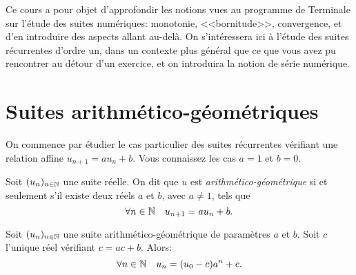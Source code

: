 \documentclass[../main.tex]{subfiles}
\begin{document}

    Ce cours a pour objet d'approfondir les notions vues au programme de Terminale sur l'étude des suites numériques: monotonie, <<bornitude>>, convergence, et d'en introduire des aspects allant au-delà. On s'intéressera ici à l'étude des suites récurrentes d'ordre un, dans un contexte plus général que ce que vous avez pu rencontrer au détour d'un exercice, et on introduira la notion de série numérique.


\section{Suites arithmético-géométriques}

On commence par étudier le cas particulier des suites récurrentes vérifiant une relation affine $u_{n+1}=au_n+b$. Vous connaissez les cas $a=1$ et $b=0$.

\begin{mydef}
    Soit $(u_n)_{n\in\mathbb N}$ une suite réelle. On dit que $u$ est \textit{arithmético-géométrique} si et seulement s'il existe deux réels $a$ et $b$, avec $a\neq 1$, tels que
    \[
    \forall n\in\mathbb N\quad
    u_{n+1} = au_n + b.
    \]
\end{mydef}

\begin{thm}\label{thmAG}
Soit $(u_n)_{n\in\mathbb N}$ une suite arithmético-géométrique de paramètres $a$ et $b$. Soit $c$ l'unique réel vérifiant $c=ac+b$. Alors:
    \[
    \forall n\in\mathbb N\quad
    u_n = (u_0-c)a^n + c.
    \]
\end{thm}
\end{document}
